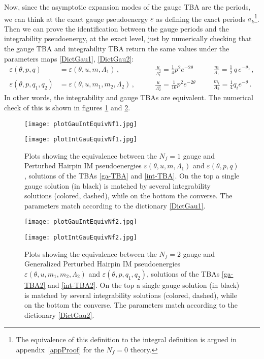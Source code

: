 \documentclass[11pt,a4paper]{elsarticle}
\def \th {\theta}
\def \ve {\varepsilon}
\def \ba {\begin{aligned}}
\def \ea {\end{aligned}}
\newcommand{\be}{\begin{equation}}
\newcommand{\ee}{\end{equation}}
\def\th{\theta}
\numberwithin{figure}{section}
\numberwithin{table}{section}
\begin{document}
Now, since the asymptotic expansion modes of the gauge TBA are the periods, we can think at the exact gauge pseudoenergy $\varepsilon$ as defining the exact periods $a_k$\footnote{The equivalence of this definition to the integral definition is argued in appendix~\ref{appProof} for the $N_f=0$ theory.}. Then we can prove the identification between the gauge periods and the integrability pseudoenergy, at the exact level, just by numerically checking that the gauge TBA and integrability TBA return the same values under the parameters maps \eqref{DictGau1}, \eqref{DictGau2}: 
\be
\ba  \label{numTBAeq}
\varepsilon(\th ,p, q)&=\varepsilon(\th ,u,m,\Lambda_1)\,,\qquad  &\frac{u}{\Lambda_1^2}=\frac{1}{4}p^2e^{-2\theta }\qquad &\frac{m}{\Lambda_1}=\frac{1}{2 }\,q\, e^{-\theta_0} \,,\\
\varepsilon(\th,p,q_1,q_2) &= \varepsilon(\th,u,m_1,m_2,\Lambda_2)\,, \qquad &\frac{u}{\Lambda_2^2} = \frac{1}{16} p^2 e^{-2\th} \, \quad &\frac{m_i}{\Lambda_2} = \frac{1}{4} q_i e^{-\theta}\,.
\ea
\ee
In other words, the integrability and gauge TBAs are equivalent.
The numerical check of this is shown in figures \ref{fig:plotequivTBA1} and \ref{fig:plotequivTBA2}. 


\begin{figure}[t]
    \centering
    \texttt{[image: plotGauIntEquivNf1.jpg]}
    
\texttt{[image: plotIntGauEquivNf1.jpg]}
    \caption{Plots showing the equivalence between the $N_f=1$ gauge and Perturbed Hairpin IM pseudoenergies $\ve(\th,u,m,\Lambda_1)$ and $\ve(\th,p,q)$, solutions of the TBAs \eqref{ga-TBA} and \eqref{int-TBA}. On the top a single gauge solution (in black) is matched by several integrability solutions (colored, dashed), while on the bottom the converse. The parameters match according to the dictionary \eqref{DictGau1}.}
    \label{fig:plotequivTBA1}
\end{figure}
    
    \begin{figure}[t]
    \centering
    \texttt{[image: plotGauIntEquivNf2.jpg]}
    
\texttt{[image: plotIntGauEquivNf2.jpg]}
    
     
    \caption{Plots showing the equivalence between the $N_f=2$ gauge and Generalized Perturbed Hairpin IM pseudoenergies $\ve(\th,u,m_1,m_2,\Lambda_2)$ and $\ve(\th,p,q_1,q_2)$, solutions of the TBAs \eqref{ga-TBA2} and \eqref{int-TBA2}. On the top a single gauge solution (in black) is matched by several integrability solutions (colored, dashed), while on the bottom the converse. The parameters match according to the dictionary \eqref{DictGau2}.}
    \label{fig:plotequivTBA2}
\end{figure}
    
\end{document}
